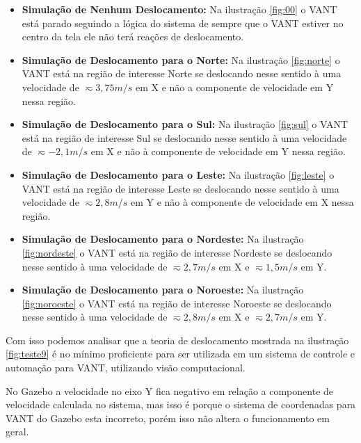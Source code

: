 \begin{itemize}
	\item \textbf{Simulação de Nenhum Deslocamento:} Na ilustração \ref{fig:00} o VANT está parado seguindo a lógica do sistema de sempre que o VANT estiver no centro da tela ele não terá reações de deslocamento.
	
	\item \textbf{Simulação de Deslocamento para o Norte:} Na ilustração \ref{fig:norte} o VANT está na região de interesse Norte se deslocando nesse sentido à uma velocidade de $\displaystyle \eqsim3,75m/s$ em X e não a componente de velocidade em Y nessa região. 
	
	\item \textbf{Simulação de Deslocamento para o Sul:} Na ilustração \ref{fig:sul} o VANT está na região de interesse Sul se deslocando nesse sentido à uma velocidade de $\displaystyle \eqsim-2,1m/s$ em X e não à componente de velocidade em Y nessa região. 
	
	\item \textbf{Simulação de Deslocamento para o Leste:} Na ilustração \ref{fig:leste} o VANT está na região de interesse Leste se deslocando nesse sentido à uma velocidade de $\displaystyle \eqsim2,8m/s$ em Y e não à componente de velocidade em X nessa região.
	
	\item \textbf{Simulação de Deslocamento para o Nordeste:} Na ilustração \ref{fig:nordeste} o VANT está na região de interesse Nordeste se deslocando nesse sentido à uma velocidade de $\displaystyle \eqsim2,7m/s$ em X e $\displaystyle \eqsim1,5m/s$ em Y.
	
	\item \textbf{Simulação de Deslocamento para o Noroeste:} Na ilustração \ref{fig:noroeste} o VANT está na região de interesse Noroeste se deslocando nesse sentido à uma velocidade de $\displaystyle \eqsim2,8m/s$ em X e $\displaystyle \eqsim2,7m/s$ em Y.
\end{itemize}

Com isso podemos analisar que a teoria de deslocamento mostrada na ilustração \ref{fig:teste9} é no mínimo proficiente para ser utilizada em um sistema de controle e automação para VANT, utilizando visão computacional. 

No Gazebo a velocidade no eixo Y fica negativo em relação a componente de velocidade calculada no sistema, mas isso é porque o sistema de coordenadas para VANT do Gazebo esta incorreto, porém isso não altera o funcionamento em geral.

